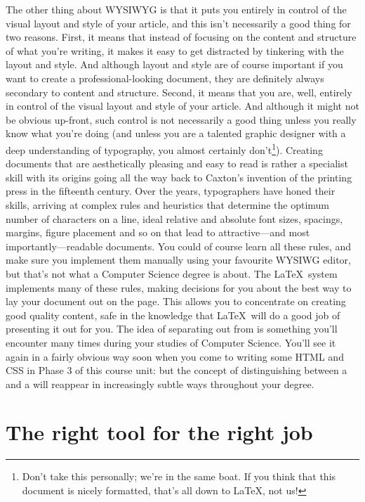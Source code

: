 \begin{refsection}
The other thing about WYSIWYG is that it puts you entirely in control of the visual layout and style of your article, and this isn't necessarily a good thing for two reasons. First, it means that instead of focusing on the content and structure of what you're writing, it makes it easy to get distracted by tinkering with the layout and style. And although layout and style are of course important if you want to create a professional-looking document, they are definitely always secondary to content and structure. Second, it means that you are, well, entirely in control of the visual layout and style of your article. And although it might not be obvious up-front, such control is not necessarily a good thing unless you really know what you're doing (and unless you are a talented graphic designer with a deep understanding of typography, you almost certainly don't\footnote{Don't take this personally; we're in the same boat. If you think that this document is nicely formatted, that's all down to \LaTeX, not us!}). Creating documents that are aesthetically pleasing and easy to read is rather a specialist skill with its origins going all the way back to Caxton's invention of the printing press in the fifteenth century.  Over the years, typographers have honed their skills, arriving at complex rules and heuristics that determine the optimum number of characters on a line, ideal relative and absolute font sizes, spacings, margins, figure placement and so on that lead to attractive---and most importantly---readable documents. You could of course learn all these rules, and make sure you implement them manually using your favourite WYSIWG editor, but that's not what a Computer Science degree is about. The \LaTeX\ system implements many of these rules, making decisions for you about the best way to lay your document out on the page. This allows you to concentrate on creating good quality content, safe in the knowledge that \LaTeX\ will do a good job of presenting it out for you. The idea of separating out  from  is something you'll encounter many times during your studies of Computer Science. You'll see it again in a fairly obvious way soon when you come to writing some HTML and CSS in Phase 3 of this course unit: but the concept of distinguishing between a  and a  will reappear in increasingly subtle ways throughout your degree. 

\section{The right tool for the right job}


\end{refsection}
